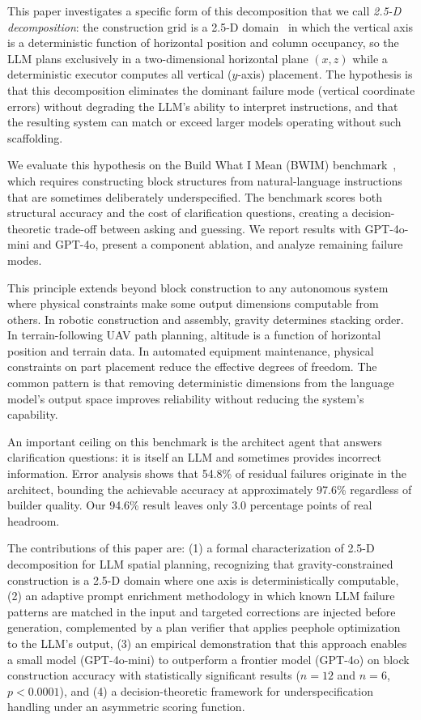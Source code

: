 \documentclass{article}
\begin{document}
This paper investigates a specific form of this decomposition that we call
\emph{2.5-D decomposition}: the construction grid is a 2.5-D
domain~\cite{marr2010} in which the vertical axis is a deterministic
function of horizontal position and column occupancy, so the LLM plans
exclusively in a two-dimensional horizontal plane $(x, z)$ while a
deterministic executor computes all vertical ($y$-axis) placement.
The hypothesis is that this decomposition eliminates the dominant
failure mode (vertical coordinate errors) without degrading the LLM's
ability to interpret instructions, and that the resulting system can match
or exceed larger models operating without such scaffolding.

We evaluate this hypothesis on the Build What I Mean (BWIM)
benchmark~\cite{bwim}, which requires constructing block structures from
natural-language instructions that are sometimes deliberately
underspecified. The benchmark scores both structural accuracy and the
cost of clarification questions, creating a decision-theoretic trade-off
between asking and guessing. We report results with GPT-4o-mini and GPT-4o,
present a component ablation, and analyze remaining failure modes.

This principle extends beyond block construction to any autonomous system
where physical constraints make some output dimensions computable from
others. In robotic construction and assembly, gravity determines stacking
order. In terrain-following UAV path planning, altitude is a function of
horizontal position and terrain data. In automated equipment maintenance,
physical constraints on part placement reduce the effective degrees of
freedom. The common pattern is that removing deterministic dimensions from
the language model's output space improves reliability without reducing
the system's capability.

An important ceiling on this benchmark is the architect agent that
answers clarification questions: it is itself an LLM and sometimes
provides incorrect information. Error analysis shows that 54.8\% of
residual failures originate in the architect, bounding the achievable
accuracy at approximately 97.6\% regardless of builder quality. Our
94.6\% result leaves only 3.0 percentage points of real headroom.

The contributions of this paper are: (1) a formal characterization of
2.5-D decomposition for LLM spatial planning, recognizing that
gravity-constrained construction is a 2.5-D domain where one axis is
deterministically computable, (2) an adaptive prompt enrichment
methodology in which known LLM failure patterns are
matched in the input and targeted corrections are injected before
generation, complemented by a plan verifier that applies peephole
optimization~\cite{mckeeman1965} to the LLM's output,
(3) an empirical demonstration that this approach enables a
small model (GPT-4o-mini) to outperform a frontier model (GPT-4o) on block
construction accuracy with statistically significant results ($n = 12$ and
$n = 6$, $p < 0.0001$), and (4) a decision-theoretic framework for
underspecification handling under an asymmetric scoring function.
\end{document}
